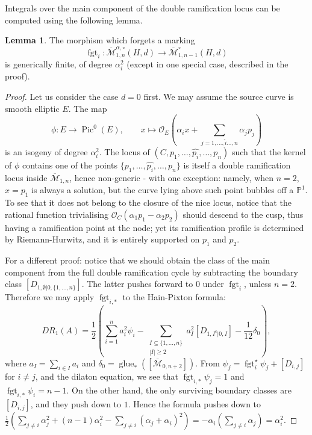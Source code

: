 \documentclass[11pt]{amsart}
\newcommand{\oM}{\overline{\mathcal{M}}}
\newcommand{\PP}{\mathbb P}
\newcommand{\st}{\star}
\newcommand{\OO}{\mathcal{O}}
\renewcommand{\to}{\rightarrow}
\newcommand{\Pic}{\operatorname{Pic}}
\newcommand{\fgt}{\operatorname{fgt}}
\newcommand{\Mcal}{\mathcal{M}}
\newcommand{\ol}[1]{\overline{#1}}
\theoremstyle{definition}
\newtheorem{lem}[thm]{Lemma}
\theoremstyle{definition}
\begin{document}
Integrals over the main component of the double ramification locus can be computed using the following lemma.
\begin{lem} \label{Lemma forget marking}The morphism which forgets a marking
\begin{equation*} \fgt_i\colon\ol\Mcal_{1,n}^{\alpha,\circ}(H,d)\to\ol\Mcal^{\circ}_{1,n-1}(H,d)\end{equation*}
is generically finite, of degree $\alpha_i^2$ (except in one special case, described in the proof).
\end{lem}
\begin{proof}
 Let us consider the case $d=0$ first. We may assume the source curve is smooth elliptic $E$. The map \[ \phi\colon E\to \Pic^0(E),\qquad x\mapsto\OO_E\left(\alpha_ix+\sum_{j=1,\ldots,\hat i\ldots,n}\alpha_jp_j\right)\]
 is an isogeny of degree $\alpha_i^2$. The locus of $(C,p_1,\ldots,\hat{p_i},\ldots,p_n)$ such that the kernel of $\phi$ contains one of the points $\{p_1,\ldots,\hat{p_i},\ldots,p_n\}$ is itself a double ramification locus inside $\oM_{1,n}$, hence non-generic - with one exception: namely, when $n=2$, $x=p_1$ is always a solution, but the curve lying above such point bubbles off a $\PP^1$. To see that it does not belong to the closure of the nice locus, notice that the rational function trivialising $\OO_C(\alpha_1p_1-\alpha_2p_2)$ should descend to the cusp, thus having a ramification point at the node; yet its ramification profile is determined by Riemann-Hurwitz, and it is entirely supported on $p_1$ and $p_2$.
 
 For a different proof: notice that we should obtain the class of the main component from the full double ramification cycle by subtracting the boundary class $[D_{1,\emptyset|0,\{1,\ldots,n\}}]$. The latter pushes forward to $0$ under $\fgt_i$, unless $n=2$. Therefore we may apply $\fgt_{i,*}$ to the Hain-Pixton formula:
 \[DR_1(A)=\frac{1}{2}\left(\sum_{i=1}^na_i^2\psi_i-\sum_{\substack{I\subseteq\{1,\ldots,n\}\\|I|\geq 2}}a_I^2[D_{1,I^c|0,I}]-\frac{1}{12}\delta_0\right),\]
 where $a_I=\sum_{i\in I}a_i$ and $\delta_0=\operatorname{glue}_*([\oM_{0,n+2}])$. From $\psi_j=\fgt_i^\st\psi_j+[D_{i,j}]$ for $i\neq j$, and the dilaton equation, we see that $\fgt_{i,*}\psi_j=1$ and $\fgt_{i,*}\psi_i=n-1$. On the other hand, the only surviving boundary classes are $[D_{i,j}]$, and they push down to $1$. Hence the formula pushes down to $\frac{1}{2}\left(\sum_{j\neq i}\alpha_j^2+(n-1)\alpha_i^2-\sum_{j\neq i}(\alpha_j+\alpha_i)^2\right)=-\alpha_i\left(\sum_{j\neq i}\alpha_j\right)=\alpha_i^2.$
\end{proof}
\end{document}
